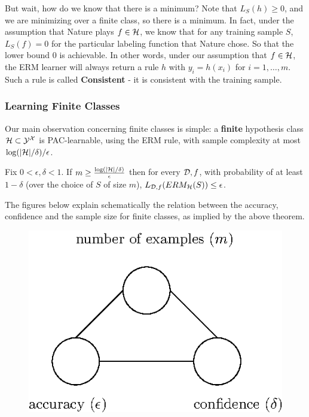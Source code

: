 But wait, how do we know that there is a minimum?  Note that $L_S(h)\geq 0$, and we are minimizing over a finite class, so there is a minimum. In fact, under the assumption that Nature plays $f\in\mathcal{H}$, we know that for any training sample $S$,  $L_S(f) = 0$ for the particular labeling function that Nature chose. So that the lower bound $0$ is achievable. In other words, under our assumption that $f\in\mathcal{H}$, the ERM learner will always return a rule  $h$ with $y_i = h(x_i)$ for $i=1,\ldots,m$. 
Such a rule is called \textbf{Consistent} - it is consistent with the training sample. 


\subsubsection{Learning Finite Classes}

Our main observation concerning finite classes is simple: a {\bf finite} hypothesis
class $\mathcal{H}\subset\mathcal{Y}^{\mathcal{X}}$ is PAC-learnable, using the ERM rule,
with sample complexity at most 
$\log(|\mathcal{H}|/\delta)/\epsilon$.

\begin{theorem}
Fix $0< \epsilon,\delta <1$. If $m \ge \frac{\log(|\mathcal{H}|/\delta)}{\epsilon}$ then for every $\mathcal{D},f$, with probability of at least $1-\delta$ (over the choice of $S$ of size $m$), $L_{\mathcal{D},f}(ERM_{\mathcal{H}}(S)) \le \epsilon$.
\end{theorem}

The figures below explain schematically the relation between the accuracy, confidence and the sample size for finite classes, as implied by the above theorem.

 \begin{figure}[h!]
 \centering\includegraphics[scale=0.8]{connection_m_eps_delta.eps}
 \end{figure}


